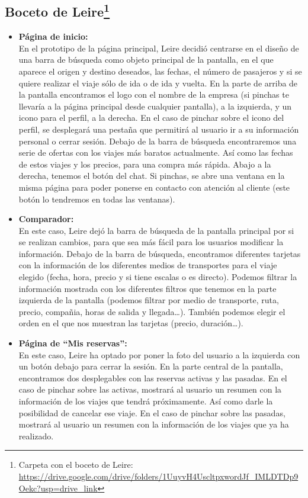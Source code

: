 \subsection[Boceto de Leire]{Boceto de Leire\footnote{Carpeta con el boceto de Leire: \url{https://drive.google.com/drive/folders/1UuyvH4UscltpxwordJf_IMLDTDp9Oekc?usp=drive_link}}}

\begin{itemize}
    \item\textbf{Página de inicio:} \\ En el prototipo de la página principal, Leire decidió centrarse en el diseño de una barra de búsqueda como objeto principal de la pantalla, en el que aparece el origen y destino deseados, las fechas, el número de pasajeros y si se quiere realizar el viaje sólo de ida o de ida y vuelta.
    En la parte de arriba de la pantalla encontramos el logo con el nombre de la empresa (si pinchas te llevaría a la página principal desde cualquier pantalla), a la izquierda, y un icono para el perfil, a la derecha.
    En el caso de pinchar sobre el icono del perfil, se desplegará una pestaña que permitirá al usuario ir a su información personal o cerrar sesión.
    Debajo de la barra de búsqueda encontraremos una serie de ofertas con los viajes más baratos actualmente. Así como las fechas de estos viajes y los precios, para una compra más rápida.
    Abajo a la derecha, tenemos el botón del chat. Si pinchas, se abre una ventana en la misma página para poder ponerse en contacto con atención al cliente (este botón lo tendremos en todas las ventanas).
    
    \item\textbf{Comparador:} \\ 
    En este caso, Leire dejó la barra de búsqueda de la pantalla principal por si se realizan cambios, para que sea más fácil para los usuarios modificar la información.
    Debajo de la barra de búsqueda, encontramos diferentes tarjetas con la información de los diferentes medios de transportes para el viaje elegido (fecha, hora, precio y si tiene escalas o es directo). Podemos filtrar la información mostrada con los diferentes filtros que tenemos en la parte izquierda de la pantalla (podemos filtrar por medio de transporte, ruta, precio, compañia, horas de salida y llegada…). También podemos elegir el orden en el que nos muestran las tarjetas (precio, duración…).
    
    \item\textbf{Página de ``Mis reservas'':} \\ En este caso, Leire ha optado por poner la foto del usuario a la izquierda con un botón debajo para cerrar la sesión.
    En la parte central de la pantalla, encontramos dos desplegables con las reservas activas y las pasadas.
    En el caso de pinchar sobre las activas, mostrará al usuario un resumen con la información de los viajes que tendrá próximamente. Así como darle la posibilidad de cancelar ese viaje.
    En el caso de pinchar sobre las pasadas, mostrará al usuario un resumen con la información de los viajes que ya ha realizado.
    

\end{itemize}

